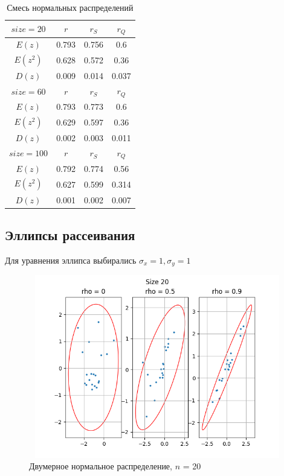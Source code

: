\begin{table}[H]
	\centering
	\begin{tabular}{| c | c | c | c |}
		
		\hline
		$size = 20$ & $r$      & $r_{S}$ & $r_{Q}$ \\
		\hline
		$E(z)$       & 0.793 & 0.756 & 0.6   \\
		$E(z^2)$    & 0.628 & 0.572 & 0.36  \\
		$D(z)$       & 0.009 & 0.014 & 0.037 \\
		\hline
		$size = 60$ & $r$      & $r_{S}$ & $r_{Q}$ \\
		\hline
		$E(z)$       & 0.793 & 0.773 & 0.6   \\
		$E(z^2)$    & 0.629 & 0.597 & 0.36  \\
		$D(z)$      & 0.002 & 0.003 & 0.011 \\
		\hline
		$size = 100$ & $r$      & $r_{S}$ & $r_{Q}$ \\
		\hline
		$E(z)$        & 0.792 & 0.774 & 0.56  \\
		$E(z^2)$     & 0.627 & 0.599 & 0.314 \\
		$D(z)$        & 0.001 & 0.002 & 0.007 \\
		\hline
		
	\end{tabular}{}
	\caption{Смесь нормальных распределений}
	\label{tab:mix_normal}
\end{table}
\subsection{Эллипсы рассеивания}
\noindent Для уравнения эллипса выбирались $\sigma_{x} = 1, \sigma_{y} = 1$

\begin{figure}[H]
	\centering
	\includegraphics[width = 13cm, height = 8cm]{resources/Ellipse_1.png}
	\caption{Двумерное нормальное распределение, $n$ = 20}
	\label{fig:n20}
\end{figure}

